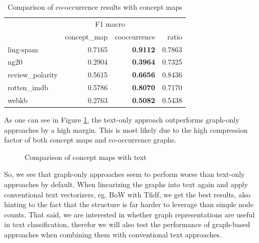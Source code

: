 \begin{table}[htb!]
	\centering
	\begin{tabular}{lrrr}
		{} &  \multicolumn{2}{c}{F1 macro} &  {} \\
		&  concept\_map &  cooccurrence &   ratio \\
		\midrule
		ling-spam       &  0.7165 &  \textbf{0.9112} &  0.7863 \\
		ng20            &  0.2904 &  \textbf{0.3964} &  0.7325 \\
		review\_polarity &  0.5615 &  \textbf{0.6656} &  0.8436 \\
		rotten\_imdb     &  0.5786 &  \textbf{0.8070} &  0.7170 \\
		webkb           &  0.2763 &  \textbf{0.5082} &  0.5438 \\
		\bottomrule
	\end{tabular}
	\caption[Results: Co-Occurrence vs. Concept Maps]{Comparison of co-occurrence results with concept maps}\label{table:comparison_results_cooccurrence}
\end{table}


As one can see in Figure \ref{fig:results_cmap_vs_text}, the text-only approach outperforms graph-only approaches by a high margin.
This is most likely due to the high compression factor of both concept maps and co-occurrence graphs.

\begin{figure}[htb!]
	\centering
	\missingfigure[figcolor=white]{}
	\caption[Results: Concept Maps vs. Text]{Comparison of concept maps with text}
	\label{fig:results_cmap_vs_text}
\end{figure}

So, we see that graph-only approaches seem to perform worse than text-only approaches by default.
When linearizing the graphs into text again and apply conventional text vectorizers, eg. BoW with Tfidf, we get the best results, also hinting to the fact that the structure is far harder to leverage than simple node counts.
That said, we are interested in whether graph representations are useful in text classification, therefor we will also test the performance of graph-based approaches when combining them with conventional text approaches.

